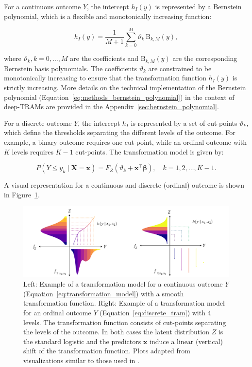 For a continuous outcome $Y$, the intercept $h_I(y)$ is represented by a Bernstein polynomial, which is a flexible and monotonically increasing function:

\begin{equation}
h_I(y) = \frac{1}{M + 1} \sum_{k=0}^{M} \vartheta_k \, \text{B}_{k, M}(y),
\label{eq:methods_bernstein_polynomial}
\end{equation}

where $\vartheta_k, k = 0, \ldots, M$ are the coefficients and $\text{B}_{k, M}(y)$ are the corresponding Bernstein basis polynomials. The coefficients $\vartheta_k$ are constrained to be monotonically increasing to ensure that the transformation function $h_I(y)$ is strictly increasing. More details on the technical implementation of the Bernstein polynomial (Equation~\ref{eq:methods_bernstein_polynomial}) in the context of deep-TRAMs are provided in the Appendix~\ref{sec:bernstein_polynomial}.






For a discrete outcome $Y$, the intercept $h_I$ is represented by a set of cut-points $\vartheta_k$, which define the thresholds separating the different levels of the outcome. For example, a binary outcome requires one cut-point, while an ordinal outcome with $K$ levels requires $K-1$ cut-points. The transformation model is given by:

\begin{equation}
P(Y \leq y_k \mid \mathbf{X} = \mathbf{x}) = F_Z(\vartheta_k + \mathbf{x}^\top \boldsymbol{\beta}), \quad k = 1, 2, \ldots, K - 1.
\label{eq:discrete_tram}
\end{equation}


A visual representation for a continuous and discrete (ordinal) outcome is shown in Figure~\ref{fig:tram_cont_ord}.


\begin{figure}[H]
\centering
\includegraphics[width=1\textwidth]{img/tram_cont_ord.png}
\caption{Left: Example of a transformation model for a continuous outcome $Y$ (Equation~\ref{eq:transformation_model}) with a smooth transformation function. Right: Example of a transformation model for an ordinal outcome $Y$ (Equation~\ref{eq:discrete_tram}) with 4 levels. The transformation function consists of cut-points separating the levels of the outcome.
In both cases the latent distribution $Z$ is the standard logistic and the predictors $\mathbf{x}$ induce a linear (vertical) shift of the transformation function. Plots adapted from visualizations similar to those used in \citet{sick2025}.}
\label{fig:tram_cont_ord}
\end{figure}


